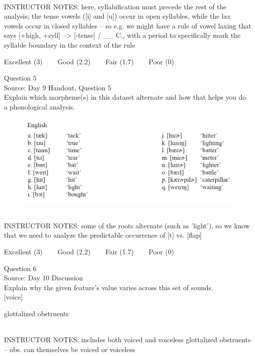 \documentclass[12pt]{article}
\begin{document}
~\\
INSTRUCTOR NOTES: here, syllabification must precede the rest of the analysis; the tense vowels ([i] and [u]) occur in open syllables, while the lax vowels occur in closed syllables -- so e.g. we might have a rule of vowel laxing that says [+high, +syll] --> [-tense] / \_\_ C., with a period to specifically mark the syllable boundary in the context of the rule


\vfill
Excellent (3) ~~~ Good (2.2) ~~~ Fair (1.7) ~~~ Poor (0)
\newpage

{\large Question 5}\\

Source: Day 9 Handout, Question 5\\

Explain which morpheme(s) in this dataset alternate and how that helps you do a phonological analysis.\\

\begin{figure}[H]
\includegraphics{../images/english_t_flap.png}
\end{figure}

~\\
INSTRUCTOR NOTES: some of the roots alternate (such as 'light'), so we know that we need to analyze the predictable occurrence of [t] vs. [flap]


\vfill
Excellent (3) ~~~ Good (2.2) ~~~ Fair (1.7) ~~~ Poor (0)
\newpage

{\large Question 6}\\

Source: Day 10 Discussion\\

Explain why the given feature's value varies across this set of sounds.\\

{[voice]}

glottalized obstruents


~\\
INSTRUCTOR NOTES: includes both voiced and voiceless glottalized obstruents -- obs. can themselves be voiced or voiceless
\end{document}

